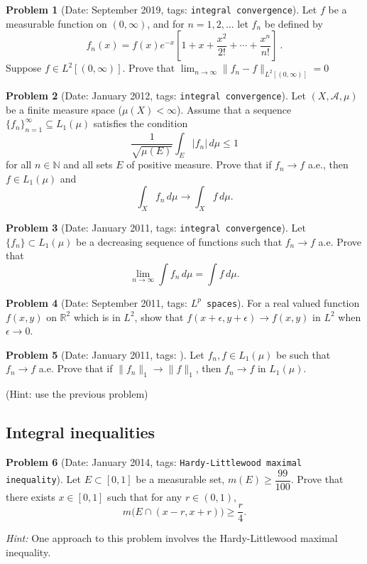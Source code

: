 \documentclass[11pt, notitlepage]{article}
\theoremstyle{definition}
\theoremstyle{definition}
\theoremstyle{definition}
\newtheorem{probstate}{Problem}
\theoremstyle{remark}
\newenvironment{problem}[2]{
    \begin{probstate}[Date: #1, tags: {\color{white} \texttt{#2}}]
}
{
  \end{probstate}
}
\newcommand{\N}{\mathbb{N}}
\begin{document}
\begin{problem}{September 2019}{integral convergence}
  Let  $f$ be a measurable function on $(0,\infty)$, and for $n=1,2,\ldots$ let
$f_n$ be defined by
$$
f_n(x)=f(x)e^{-x}\left[1+x+\frac{x^2}{2!}+\cdots+\frac{x^n}{n!}\right] \ .
$$
Suppose $f \in L^2[(0,\infty)]$. Prove that $\lim_{n\to \infty}\|f_n-f\|_{L^2[(0,\infty)]}=0$
\end{problem}

\begin{problem}{January 2012}{integral convergence}
  Let $(X, \mathcal{A}, \mu)$ be a finite measure space ($\mu(X)< \infty$). Assume that a sequence $\{f_n\}_{n=1}^{\infty} \subseteq L_1(\mu)$ satisfies the condition
\[
  \frac{1}{\sqrt{\mu(E)}} \int_E |f_n| \, d\mu \le 1
\]
for all $n \in \N$ and all sets $E$ of positive measure. Prove that if $f_n \to f$ a.e., then $f \in L_1(\mu)$ and
\[
  \int_X f_n \, d \mu \to \int_X f \, d \mu.
 \]
\end{problem}

\begin{problem}{January 2011}{integral convergence}
  Let $\{f_n\} \subset L_1(\mu)$ be a decreasing sequence of functions such that $f_n \to f$ a.e.
  Prove that
    \[
      \lim_{n \to \infty} \int f_n \, d \mu = \int f \, d \mu.
    \]
\end{problem}

\begin{problem}{September 2011}{$L^p$ spaces}
  For a real valued function $f(x,y)$ on $\mathbb R^2$ which is in $L^2$, show that $f(x+\epsilon,y+\epsilon) \rightarrow f(x,y)$ in $L^2$ when $\epsilon \rightarrow 0$.
\end{problem}

\begin{problem}{January 2011}{}
  Let $f_n,f \in L_1(\mu)$ be such that $f_n \to f$ a.e.
    Prove that if \newline
    $\|f_n\|_1 \to \|f\|_1$,
    then $f_n \to f$ in $L_1(\mu)$.

    (Hint: use the previous problem)

\end{problem}

\subsection{Integral inequalities}

\begin{problem}{January 2014}{Hardy-Littlewood maximal inequality}
Let $E \subset [0,1]$ be a measurable set, $m(E) \ge \dfrac{99}{100}$. Prove that there exists $x \in [0,1]$ such that for any $r \in (0,1)$,
    \[
      m \big( E \cap (x-r,x+r) \big) \ge \frac{r}{4}.
    \]

\emph{Hint:} One approach to this problem involves the Hardy-Littlewood maximal inequality.
\end{problem}
\end{document}
